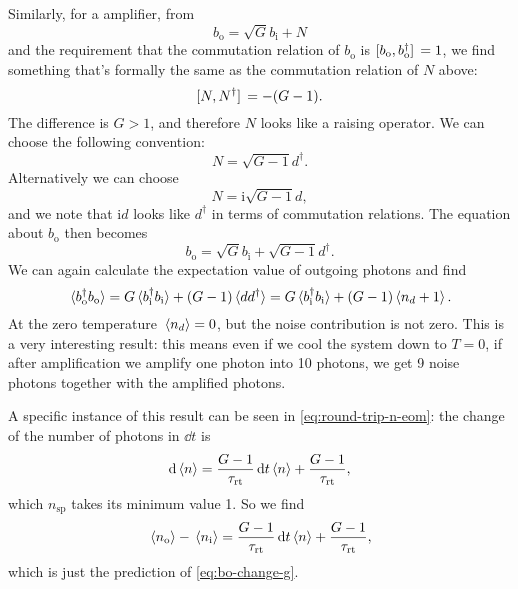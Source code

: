 \documentclass[hyperref, a4paper]{article}
\newcommand*{\ii}{\mathrm{i}}
\newcommand*{\bi}{b_{\text{i}}}
\newcommand*{\bo}{b_{\text{o}}}
\begin{document}
Similarly, for a amplifier, from 
\begin{equation}
    \bo = \sqrt{G} \bi + N
\end{equation}
and the requirement that the commutation relation of $\bo$ is $\comm*{\bo}{\bo^\dag} = 1$,
we find something that's formally the same as the commutation relation of $N$ above:
\begin{equation}
    \comm*{N}{N^\dag} = - (G-1).
\end{equation}
The difference is $G > 1$, and therefore $N$ looks like a raising operator.
We can choose the following convention:
\begin{equation}
    N = \sqrt{G-1} d^\dag.
\end{equation}
Alternatively we can choose 
\begin{equation}
    N = \ii \sqrt{G-1} d,
\end{equation}
and we note that $\ii d$ looks like $d^\dag$ in terms of commutation relations.
The equation about $\bo$ then becomes 
\begin{equation}
    \bo = \sqrt{G} \bi + \sqrt{G-1} d^\dag.
\end{equation}
We can again calculate the expectation value of outgoing photons and find 
\begin{equation}
    \expval*{\bo^\dag \bo} = G \expval*{\bi^\dag \bi} + (G-1) \expval*{d d^\dag}
    = G \expval*{\bi^\dag \bi} + (G - 1) \expval*{n_d + 1}.
    \label{eq:bo-change-g}
\end{equation}
At the zero temperature $\expval*{n_d} = 0$, but the noise contribution is not zero.
This is a very interesting result:
this means even if we cool the system down to $T=0$,
if after amplification we amplify one photon into 10 photons,
we get 9 noise photons together with the amplified photons.

A specific instance of this result can be seen in \eqref{eq:round-trip-n-eom}:
the change of the number of photons in $\dd{t}$ is 
\begin{equation}
    \dd{\expval{n}} = \frac{G-1}{\tau_{\text{rt}}} \dd{t} \expval{n} 
    + \frac{G-1}{\tau_{\text{rt}}} ,
\end{equation}
which $n_{\text{sp}}$ takes its minimum value 1.
So we find 
\begin{equation}
    \expval*{n_{\text{o}}} - \expval*{n_{\text{i}}} = \frac{G-1}{\tau_{\text{rt}}} \dd{t} \expval{n} 
    + \frac{G-1}{\tau_{\text{rt}}} ,
\end{equation}
which is just the prediction of \eqref{eq:bo-change-g}.
\end{document}
